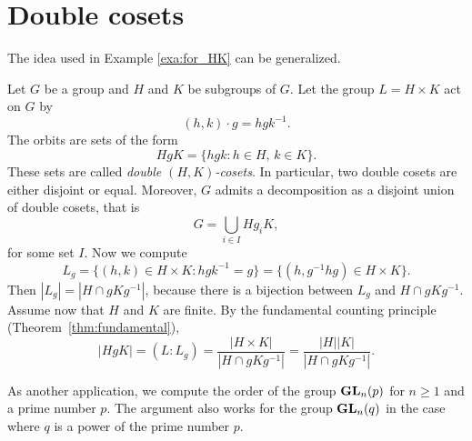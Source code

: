 \section{Double cosets} 

The idea used in Example \ref{exa:for_HK} can be generalized. 

\begin{optional}
\begin{example}
Let $G$ be a group and $H$ and $K$ be subgroups of $G$. Let the group $L=H\times K$ act on $G$ by
\[
(h,k)\cdot g=hgk^{-1}.
\]
The orbits are sets of the form 
\[
HgK=\{hgk:h\in H,\,k\in K\}.
\]
These sets are called \emph{double $(H,K)$-cosets}. 
In particular, two double cosets are either disjoint 
or equal. Moreover, $G$ admits a decomposition 
as a disjoint union of double cosets, that is 
\[
G=\bigcup_{i\in I}Hg_iK,
\]
for some set $I$. Now we compute 
\[
L_g=\{(h,k)\in H\times K:hgk^{-1}=g\}=\{(h,g^{-1}hg)\in H\times K\}.
\]
Then $|L_g|=|H\cap gKg^{-1}|$, because there is a bijection between $L_g$ and
$H\cap gKg^{-1}$.
Assume now that $H$ and $K$ are finite. 
By the fundamental counting principle (Theorem~\ref{thm:fundamental}), 
\[
|HgK|=(L:L_g)=\frac{|H\times K|}{|H\cap gKg^{-1}|}=\frac{|H||K|}{|H\cap gKg^{-1}|}.
\]
\end{example}
\end{optional}

As another application, we compute the
order of the group $\mathbf{GL}_n(p)$ for $n\geq1$ and 
a prime number $p$. 
The argument also works for
the group $\mathbf{GL}_n(q)$ in the case where
$q$ is a power of the prime number $p$.

